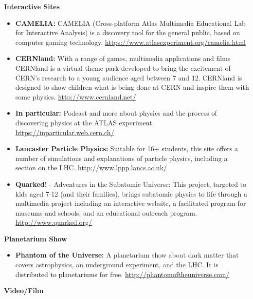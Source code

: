 \textbf{Interactive Sites}

\begin{itemize}
\tightlist
\item
  \textbf{CAMELIA:} CAMELIA (Cross-platform Atlas Multimedia Educational
  Lab for Interactive Analysis) is a discovery tool for the general
  public, based on computer gaming technology.
  \url{https://www.atlasexperiment.org/camelia.html}
\item
  \textbf{CERNland:} With a range of games, multimedia applications and
  films CERNland is a virtual theme park developed to bring the
  excitement of CERN's research to a young audience aged between 7 and
  12. CERNland is designed to show children what is being done at CERN
  and inspire them with some physics. \url{http://www.cernland.net/}
\item
  \textbf{In particular:} Podcast and more about physics and the process
  of discovering physics at the ATLAS experiment.
  \url{https://inparticular.web.cern.ch/}
\item
  \textbf{Lancaster Particle Physics:} Suitable for 16+ students, this
  site offers a number of simulations and explanations of particle
  physics, including a section on the LHC.
  \url{http://www.lppp.lancs.ac.uk/}
\item
  \textbf{Quarked!} - Adventures in the Subatomic Universe: This
  project, targeted to kids aged 7-12 (and their families), brings
  subatomic physics to life through a multimedia project including an
  interactive website, a facilitated program for museums and schools,
  and an educational outreach program. \url{http://www.quarked.org/}
\end{itemize}

\textbf{Planetarium Show}

\begin{itemize}
\tightlist
\item
  \textbf{Phantom of the Universe:} A planetarium show about dark matter
  that covers astrophysics, an underground experiment, and the LHC. It
  is distributed to planetariums for free.
  \url{http://phantomoftheuniverse.com/}
\end{itemize}

\textbf{Video/Film}

